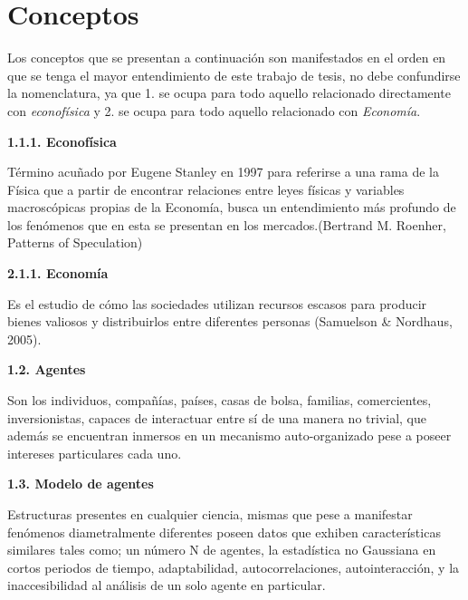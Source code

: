 %
\chapter{Conceptos}
\label{sec:related}



{
    \noindent
 Los conceptos que se presentan a continuación son manifestados en el orden en que se tenga el mayor entendimiento de este trabajo de tesis, no debe confundirse la nomenclatura, ya que 1. se ocupa para todo aquello relacionado directamente con \textit{econofísica} y 2. se ocupa para todo aquello relacionado con \textit{Economía}.\newline
}

{
\noindent
\Large \textbf{1.1.1. Econofísica}
}

Término acuñado por Eugene Stanley en 1997 para referirse a una rama de la Física que a partir de encontrar relaciones entre leyes físicas y variables macroscópicas propias de la Economía, busca un entendimiento más profundo de los fenómenos que en esta se presentan en los mercados.(Bertrand M. Roenher, Patterns of Speculation)
\newline

{
\noindent
\Large  \textbf{2.1.1. Economía} 
}

Es el estudio de cómo las sociedades utilizan recursos escasos para producir bienes valiosos y distribuirlos entre diferentes personas (Samuelson \& Nordhaus, 2005).
\newline

{
\noindent
\Large  \textbf{1.2. Agentes} 
}

Son los individuos, compañías, países, casas de bolsa, familias, comercientes, inversionistas, capaces de interactuar entre sí de una manera no trivial, que además se encuentran inmersos en un mecanismo auto-organizado pese a poseer intereses particulares cada uno.
\newpage

{
\noindent
\Large  \textbf{1.3. Modelo de agentes} 
}

Estructuras presentes en cualquier ciencia, mismas que pese a manifestar fenómenos diametralmente diferentes poseen datos que exhiben características similares tales como; un número N de agentes, la estadística no Gaussiana en cortos periodos de tiempo, adaptabilidad, autocorrelaciones, autointeracción, y la inaccesibilidad al análisis de un solo agente en particular.
\newline

